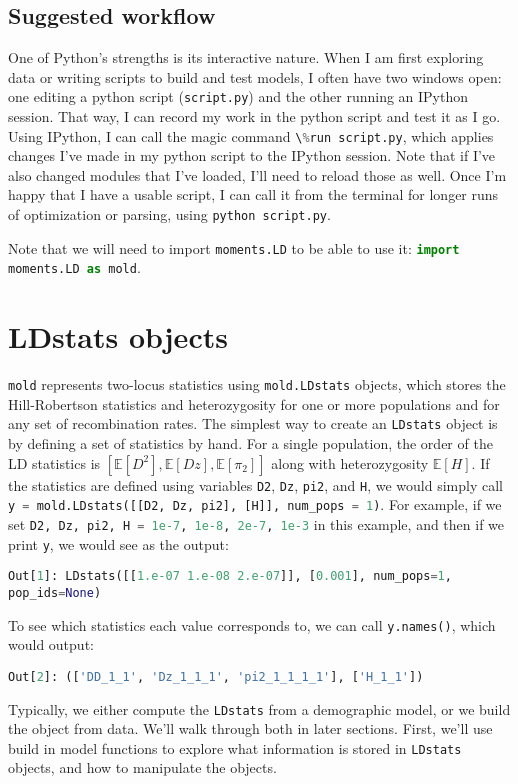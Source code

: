 \documentclass[10pt]{article}
\makeatletter
\newcommand{\mold}{\texttt{mold}\xspace}
\newcommand{\py}[1]{\lstinline[breaklines=true,language=Python, showstringspaces=False]@#1@}
\newcommand{\E}{\mathbb{E}}
\makeatother
\begin{document}
\subsection{Suggested workflow}

One of Python's strengths is its interactive nature.
When I am first exploring data or writing scripts to build and test models, I often have two windows open: one editing a python script (\py{script.py}) and the other running an IPython session.
That way, I can record my work in the python script and test it as I go.
Using IPython, I can call the magic command \py{\%run script.py}, which applies changes I've made in my python script to the IPython session.
Note that if I've also changed modules that I've loaded, I'll need to reload those as well.
Once I'm happy that I have a usable script, I can call it from the terminal for longer runs of optimization or parsing, using \py{python script.py}.

Note that we will need to import \py{moments.LD} to be able to use it: \py{import moments.LD as mold}.

\section{LDstats objects}

\mold represents two-locus statistics using \py{mold.LDstats} objects, which stores the Hill-Robertson statistics and heterozygosity for one or more populations and for any set of recombination rates.
The simplest way to create an \py{LDstats} object is by defining a set of statistics by hand.
For a single population, the order of the LD statistics is $[\E[D^2], \E[Dz], \E[\pi_2]]$ along with heterozygosity $\E[H]$.
If the statistics are defined using variables \py{D2}, \py{Dz}, \py{pi2}, and \py{H}, we would simply call \py{y = mold.LDstats([[D2, Dz, pi2], [H]], num_pops = 1)}.
For example, if we set \py{D2, Dz, pi2, H = 1e-7, 1e-8, 2e-7, 1e-3} in this example, and then if we print \py{y}, we would see as the output:

\py{Out[1]: LDstats([[1.e-07 1.e-08 2.e-07]], [0.001], num_pops=1, pop_ids=None)}

To see which statistics each value corresponds to, we can call \py{y.names()}, which would output:

\py{Out[2]: (['DD_1_1', 'Dz_1_1_1', 'pi2_1_1_1_1'], ['H_1_1'])}

Typically, we either compute the \py{LDstats} from a demographic model, or we build the object from data.
We'll walk through both in later sections.
First, we'll use build in model functions to explore what information is stored in \py{LDstats} objects, and how to manipulate the objects.
\end{document}
